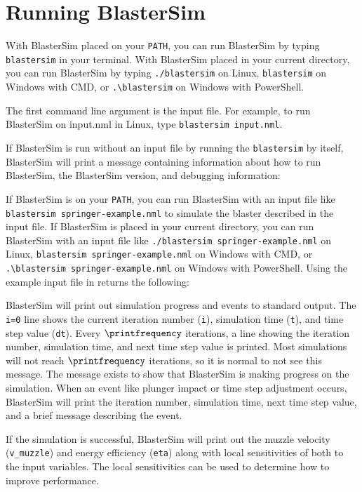 \section{Running BlasterSim}\label{running}

With BlasterSim placed on your \texttt{PATH}, you can run BlasterSim by typing \texttt{blastersim} in your terminal.
With BlasterSim placed in your current directory, you can run BlasterSim by typing \texttt{./blastersim} on Linux, \texttt{blastersim} on Windows with CMD, or \texttt{.\textbackslash{}blastersim} on Windows with PowerShell.

The first command line argument is the input file.
For example, to run BlasterSim on input.nml in Linux, type \texttt{blastersim input.nml}.

If BlasterSim is run without an input file by running the \texttt{blastersim} by itself, BlasterSim will print a message containing information about how to run BlasterSim, the BlasterSim version, and debugging information:


If BlasterSim is on your \texttt{PATH}, you can run BlasterSim with an input file like \texttt{blastersim springer-example.nml} to simulate the blaster described in the input file.
If BlasterSim is placed in your current directory, you can run BlasterSim with an input file like \texttt{./blastersim springer-example.nml} on Linux, \texttt{blastersim springer-example.nml} on Windows with CMD, or \texttt{.\textbackslash{}blastersim springer-example.nml} on Windows with PowerShell.
Using the example input file in  returns the following:


BlasterSim will print out simulation progress and events to standard output.
The \texttt{i=0} line shows the current iteration number (\texttt{i}), simulation time (\texttt{t}), and  time step value (\texttt{dt}).
Every $\printfrequency$ iterations, a line showing the iteration number, simulation time, and next time step value is printed.
Most simulations will not reach $\printfrequency$ iterations, so it is normal to not see this message.
The message exists to show that BlasterSim is making progress on the simulation.
When an event like plunger impact or time step adjustment occurs, BlasterSim will print the iteration number, simulation time, next time step value, and a brief message describing the event.

If the simulation is successful, BlasterSim will print out the muzzle velocity (\texttt{v\_muzzle}) and energy efficiency (\texttt{eta}) along with local sensitivities of both to the input variables.
The local sensitivities can be used to determine how to improve performance.

